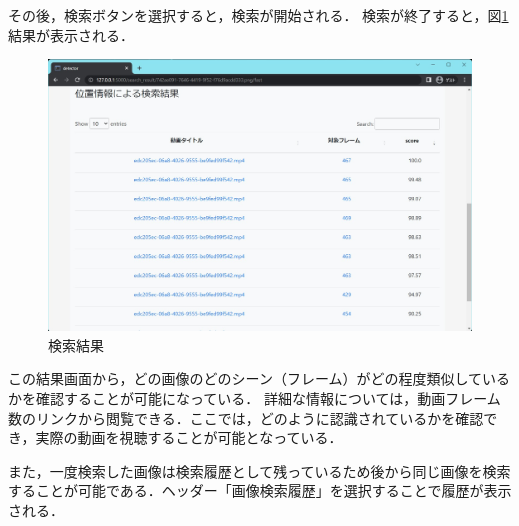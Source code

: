 \documentclass[a4j,12pt,dvipdfmx]{jreport}
\begin{document}
その後，検索ボタンを選択すると，検索が開始される．
検索が終了すると，図\ref{fig:search_result}結果が表示される．

\begin{figure}[H]
  \centering
  \includegraphics[width=13cm]{image/search_result.jpg}
  \caption{検索結果}
  \label{fig:search_result}
\end{figure}


この結果画面から，どの画像のどのシーン（フレーム）がどの程度類似しているかを確認することが可能になっている．
詳細な情報については，動画フレーム数のリンクから閲覧できる．ここでは，どのように認識されているかを確認でき，実際の動画を視聴することが可能となっている．

また，一度検索した画像は検索履歴として残っているため後から同じ画像を検索することが可能である．ヘッダー「画像検索履歴」を選択することで履歴が表示される．
\end{document}
